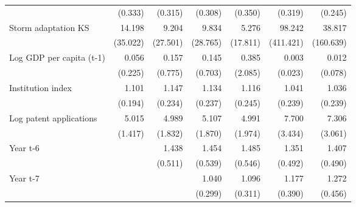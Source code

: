 \begin{table}[htbp]
\begin{tabular}{l*{6}{D{.}{.}{-1}}}
                    &     (0.333)         &     (0.315)         &     (0.308)         &     (0.350)         &     (0.319)         &     (0.245)         \\
\addlinespace
Storm adaptation KS &      14.198         &       9.204         &       9.834         &       5.276         &      98.242         &      38.817         \\
                    &    (35.022)         &    (27.501)         &    (28.765)         &    (17.811)         &   (411.421)         &   (160.639)         \\
\addlinespace
Log GDP per capita (t-1)&       0.056         &       0.157         &       0.145         &       0.385         &       0.003         &       0.012         \\
                    &     (0.225)         &     (0.775)         &     (0.703)         &     (2.085)         &     (0.023)         &     (0.078)         \\
\addlinespace
Institution index   &       1.101         &       1.147         &       1.134         &       1.116         &       1.041         &       1.036         \\
                    &     (0.194)         &     (0.234)         &     (0.237)         &     (0.245)         &     (0.239)         &     (0.239)         \\
\addlinespace
Log patent applications&       5.015\sym{***}&       4.989\sym{***}&       5.107\sym{***}&       4.991\sym{***}&       7.700\sym{***}&       7.306\sym{***}\\
                    &     (1.417)         &     (1.832)         &     (1.870)         &     (1.974)         &     (3.434)         &     (3.061)         \\
\addlinespace
Year t-6            &                     &       1.438         &       1.454         &       1.485         &       1.351         &       1.407         \\
                    &                     &     (0.511)         &     (0.539)         &     (0.546)         &     (0.492)         &     (0.490)         \\
\addlinespace
Year t-7            &                     &                     &       1.040         &       1.096         &       1.177         &       1.272         \\
                    &                     &                     &     (0.299)         &     (0.311)         &     (0.390)         &     (0.456)         \\

\end{tabular}
\end{table}
